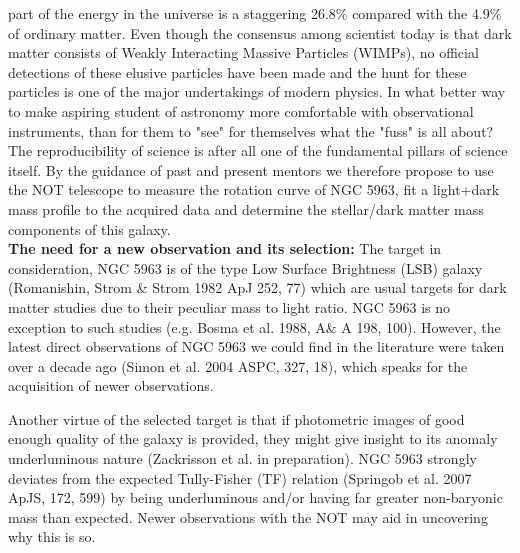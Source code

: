 \documentclass[11pt]{article}           %
\begin{document}
\begin{scienpage}[][]{}
{part of the energy in the universe is a staggering 26.8\%
compared with the 4.9\% of ordinary matter. Even though the consensus among scientist
today is that dark matter consists of Weakly Interacting Massive Particles
(WIMPs), no official detections of these elusive particles have been made and
the hunt for these particles is one of the major undertakings of modern physics.
In what better way to make aspiring student of astronomy more comfortable
with observational instruments, than for them to "see" for
themselves what the "fuss" is all about? The reproducibility of science is
after all one of the fundamental pillars of science itself.
By the guidance of past and present mentors we therefore propose to use the
NOT telescope
to measure the rotation curve of NGC 5963, fit a light+dark mass profile 
to the acquired data and determine the stellar/dark matter mass components of
this galaxy. \\

\noindent \textbf{The need for a new observation and its selection:} The target in consideration, NGC 5963 is of the type Low Surface Brightness (LSB) galaxy (Romanishin, Strom \& Strom 1982 ApJ 252, 77) which are usual targets for dark matter studies due to their peculiar mass to light ratio. NGC 5963 is no exception to such studies (e.g. Bosma et al. 1988, A\& A 198, 100). However, the latest  direct observations of NGC 5963 we could find in the literature were taken over a decade ago (Simon et al. 2004 ASPC, 327, 18), which speaks for the acquisition of newer observations. 
\par
Another virtue of the selected target is that if photometric images of good enough quality of the galaxy is provided, they might give insight to its anomaly underluminous nature (Zackrisson et al. in preparation). NGC 5963 strongly deviates from the expected Tully-Fisher (TF) relation (Springob et al. 2007 ApJS, 172, 599) by being underluminous and/or having far greater non-baryonic mass than expected. Newer observations with the NOT may aid in uncovering why this is so.
 
   }
\end{scienpage}

\newpage        %
\putnumberLarge
\end{document}
